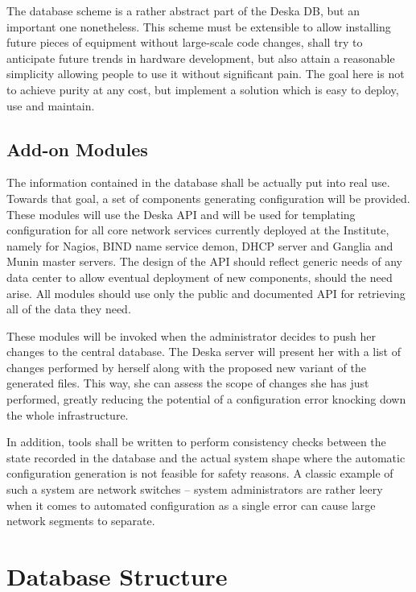 \documentclass[a4paper]{jpconf}
\begin{document}
The database scheme is a rather abstract part of the Deska DB, but an important one nonetheless.  This scheme must be extensible to
allow installing future pieces of equipment without large-scale code changes, shall try to anticipate future trends in hardware
development, but also attain a reasonable simplicity allowing people to use it without significant pain.  The goal here is not to
achieve purity at any cost, but implement a solution which is easy to deploy, use and maintain.

\subsection{Add-on Modules}

The information contained in the database shall be actually put into real use.  Towards that goal, a set of components generating
configuration will be provided.  These modules will use the Deska API and will be used for templating configuration for all core
network services currently deployed at the Institute, namely for Nagios, BIND name service demon, DHCP server and Ganglia and Munin
master servers.  The design of the API should reflect generic needs of any data center to allow eventual deployment of new components,
should the need arise.  All modules should use only the public and documented API for retrieving all of the data they need.

These modules will be invoked when the administrator decides to push her changes to the central database.  The Deska server will
present her with a list of changes performed by herself along with the proposed new variant of the generated files.  This way, she can
assess the scope of changes she has just performed, greatly reducing the potential of a configuration error knocking down the whole
infrastructure.

In addition, tools shall be written to perform consistency checks between the state recorded in the database and the actual system
shape where the automatic configuration generation is not feasible for safety reasons.  A classic example of such a system are network
switches -- system administrators are rather leery when it comes to automated configuration as a single error can cause large network
segments to separate.

\section{Database Structure}
\end{document}
